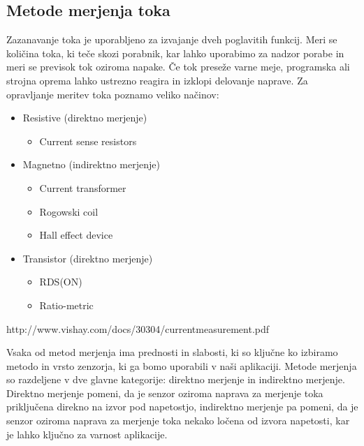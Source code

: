 \documentclass[12pt,a4paper,titlepage,openany]{report}
\begin{document}
\subsection{Metode merjenja toka}
Zazanavanje toka je uporabljeno za izvajanje dveh poglavitih funkcij. Meri se količina toka, ki teče skozi porabnik, kar lahko uporabimo za nadzor porabe in meri se previsok tok oziroma napake. Če tok preseže varne meje, programska ali strojna oprema lahko ustrezno reagira in izklopi delovanje naprave. Za opravljanje meritev toka poznamo veliko načinov:

\begin{itemize}
\item Resistive (direktno merjenje)

\begin{itemize}
\item Current sense resistors
\end{itemize}

 \item Magnetno (indirektno merjenje)

\begin{itemize}
\item Current transformer
\item Rogowski coil
\item Hall effect device
\end{itemize}

\item Transistor (direktno merjenje)

\begin{itemize}
\item RDS(ON)
\item Ratio-metric
\end{itemize}

\end{itemize}

http://www.vishay.com/docs/30304/currentmeasurement.pdf

Vsaka od metod merjenja ima prednosti in slabosti, ki so ključne ko izbiramo metodo in vrsto zenzorja, ki ga bomo uporabili
v naši aplikaciji. Metode merjenja so razdeljene v dve glavne kategorije: direktno merjenje in indirektno merjenje.
Direktno merjenje pomeni, da je  senzor oziroma naprava za merjenje toka priključena direkno na izvor pod napetostjo, 
indirektno merjenje pa pomeni, da je senzor oziroma naprava za merjenje toka nekako ločena od izvora napetosti, 
kar je lahko ključno za varnost aplikacije. \cite{ComponrentsAndMethodsForCurrentMeasurement}
\end{document}
